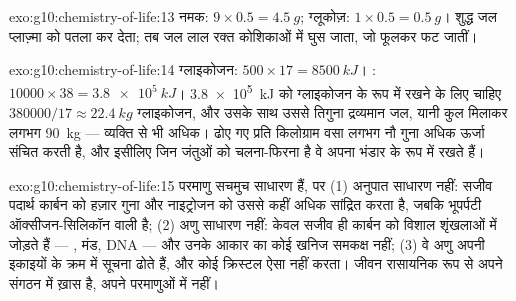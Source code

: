 \begin{solution}{exo:g10:chemistry-of-life:13}
नमक: $9 \times 0.5 = \qty{4.5}{g}$; ग्लूकोज़: $1 \times 0.5 =
\qty{0.5}{g}$। शुद्ध जल प्लाज़्मा को पतला कर देता; तब जल लाल रक्त
कोशिकाओं में घुस जाता, जो फूलकर फट जातीं।
\end{solution}

\begin{solution}{exo:g10:chemistry-of-life:14}
ग्लाइकोजन: $500 \times 17 = \qty{8500}{kJ}$। : $10000 \times 38 =
\qty{3.8e5}{kJ}$। \qty{3.8e5}{kJ} को ग्लाइकोजन के रूप में रखने के लिए चाहिए $380000/17
\approx \qty{22.4}{kg}$ ग्लाइकोजन, और उसके साथ उससे तिगुना द्रव्यमान
जल, यानी कुल मिलाकर लगभग \qty{90}{kg} --- व्यक्ति से भी अधिक।
ढोए गए प्रति किलोग्राम वसा लगभग नौ गुना अधिक ऊर्जा संचित करती है, और
इसीलिए जिन जंतुओं को चलना-फिरना है वे अपना भंडार  के रूप में रखते
हैं।
\end{solution}

\begin{solution}{exo:g10:chemistry-of-life:15}
परमाणु सचमुच साधारण हैं, पर (1) अनुपात साधारण नहीं: सजीव पदार्थ कार्बन
को हज़ार गुना और नाइट्रोजन को उससे कहीं अधिक सांद्रित करता है, जबकि
भूपर्पटी ऑक्सीजन-सिलिकॉन वाली है; (2) अणु साधारण नहीं: केवल सजीव ही
कार्बन को विशाल शृंखलाओं में जोड़ते हैं --- , मंड, DNA --- और
उनके आकार का कोई खनिज समकक्ष नहीं; (3) वे अणु अपनी इकाइयों के क्रम में
सूचना ढोते हैं, और कोई क्रिस्टल ऐसा नहीं करता। जीवन रासायनिक रूप से
अपने संगठन में ख़ास है, अपने परमाणुओं में नहीं।
\end{solution}

